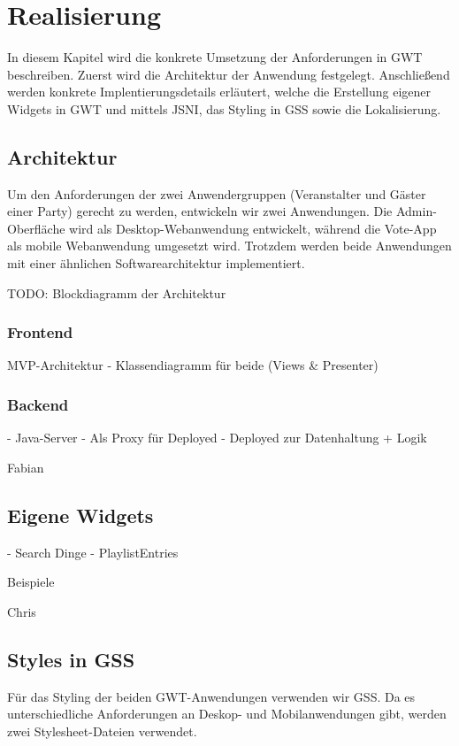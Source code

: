 \section{Realisierung}

In diesem Kapitel wird die konkrete Umsetzung der Anforderungen in GWT beschreiben.
Zuerst wird die Architektur der Anwendung festgelegt. Anschließend werden konkrete
Implentierungsdetails erläutert, welche die Erstellung eigener Widgets in GWT und
mittels JSNI, das Styling in GSS sowie die Lokalisierung.

\subsection{Architektur}

Um den Anforderungen der zwei Anwendergruppen (Veranstalter und Gäster einer Party) gerecht
zu werden, entwickeln wir zwei Anwendungen. Die Admin-Oberfläche wird als Desktop-Webanwendung
entwickelt, während die Vote-App als mobile Webanwendung umgesetzt wird. Trotzdem werden
beide Anwendungen mit einer ähnlichen Softwarearchitektur implementiert.

TODO: Blockdiagramm der Architektur

\subsubsection{Frontend}
MVP-Architektur
- Klassendiagramm für beide (Views \& Presenter)

\subsubsection{Backend}
- Java-Server
- Als Proxy für Deployed
- Deployed zur Datenhaltung + Logik

Fabian

\subsection{Eigene Widgets}
- Search Dinge
- PlaylistEntries

Beispiele

Chris

\subsection{Styles in GSS}
Für das Styling der beiden GWT-Anwendungen verwenden wir GSS. Da es unterschiedliche Anforderungen
an Deskop- und Mobilanwendungen gibt, werden zwei Stylesheet-Dateien verwendet.

